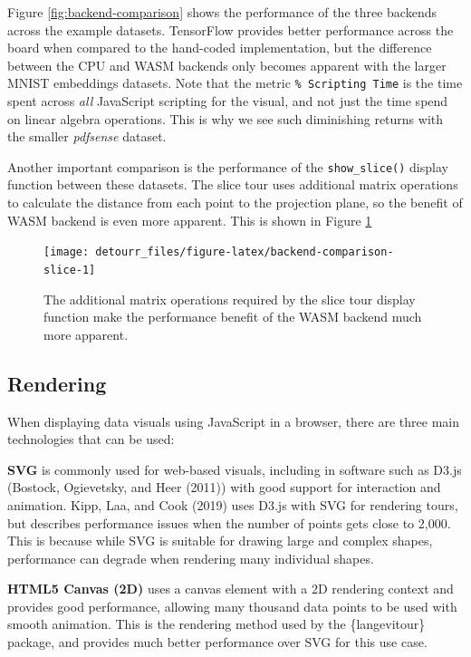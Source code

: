 Figure \ref{fig:backend-comparison} shows the performance of the three backends across the example datasets. TensorFlow provides better performance across the board when compared to the hand-coded implementation, but the difference between the CPU and WASM backends only becomes apparent with the larger MNIST embeddings datasets. Note that the metric \texttt{\%\ Scripting\ Time} is the time spent across \emph{all} JavaScript scripting for the visual, and not just the time spend on linear algebra operations. This is why we see such diminishing returns with the smaller \emph{pdfsense} dataset.

Another important comparison is the performance of the \texttt{show\_slice()} display function between these datasets. The slice tour uses additional matrix operations to calculate the distance from each point to the projection plane, so the benefit of WASM backend is even more apparent. This is shown in Figure \ref{fig:backend-comparison-slice}

\begin{figure}

{\centering \texttt{[image: detourr\_files/figure-latex/backend-comparison-slice-1]} 

}

\caption{The additional matrix operations required by the slice tour display function make the performance benefit of the WASM backend much more apparent.}\label{fig:backend-comparison-slice}
\end{figure}

\hypertarget{rendering}{%
\subsection{Rendering}\label{rendering}}

When displaying data visuals using JavaScript in a browser, there are three main technologies that can be used:

\textbf{SVG} is commonly used for web-based visuals, including in software such as D3.js (Bostock, Ogievetsky, and Heer (2011)) with good support for interaction and animation. Kipp, Laa, and Cook (2019) uses D3.js with SVG for rendering tours, but describes performance issues when the number of points gets close to 2,000. This is because while SVG is suitable for drawing large and complex shapes, performance can degrade when rendering many individual shapes.

\textbf{HTML5 Canvas (2D)} uses a canvas element with a 2D rendering context and provides good performance, allowing many thousand data points to be used with smooth animation. This is the rendering method used by the \{langevitour\} package, and provides much better performance over SVG for this use case.

